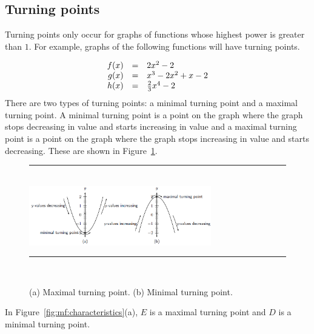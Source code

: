 \subsection*{Turning points}
\nopagebreak
Turning points only occur for graphs of functions whose highest power is greater than $1$. For example, graphs of the following functions will have turning points.\par 
\nopagebreak\noindent{}
\begin{equation*}
\begin{array}{ccc}\hfill f(x)& =& 2{x}^{2}-2\hfill \\ 
\hfill g(x)& =& {x}^{3}-2{x}^{2}+x-2\hfill \\ 
\hfill h(x)& =& \frac{2}{3}{x}^{4}-2\hfill \end{array}
\end{equation*}
There are two types of turning points: a minimal turning point and a maximal turning point. A minimal turning point is a point on the graph where the graph stops decreasing in value and starts increasing in value and a maximal turning point is a point on the graph where the graph stops increasing in value and starts decreasing. These are shown in Figure~\ref{m39337*uid48!!!underscore!!!printimage}.\par 

\begin{figure}[H] %
\begin{center}
\rule[.1in]{\figurerulewidth}{.005in} \\
\includegraphics[width=300px]{col11306.imgs/m39337_MG10C11_035.png} %
\vspace{2pt}
\vspace{\rubberspace}\par 
\caption{(a) Maximal turning point. (b) Minimal turning point.}
\label{m39337*uid48!!!underscore!!!printimage}
\vspace{.1in}
\rule[.1in]{\figurerulewidth}{.005in} \\
\end{center}
\end{figure}       

In Figure~\ref{fig:mf:characteristics}(a), $E$ is a maximal turning point and $D$ is a minimal turning point.\par 

